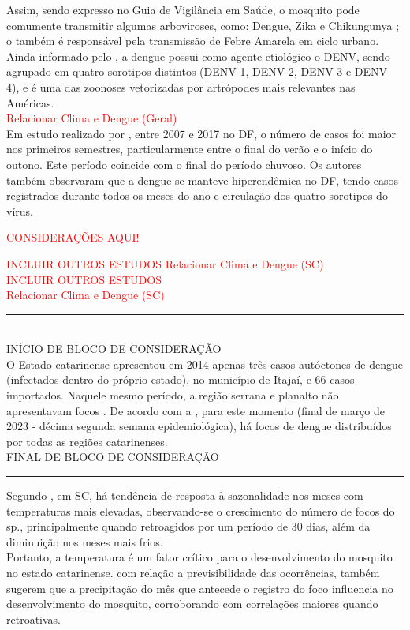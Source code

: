 \indent Assim, sendo expresso no Guia de Vigilância em Saúde, o mosquito  pode comumente transmitir algumas arboviroses, como: Dengue, Zika e Chikungunya \cite{GuiaVigSaúde22}; o  também é responsável pela transmissão de Febre Amarela em ciclo urbano. Ainda informado pelo , a dengue possui como agente etiológico o \acrfull{DENV}, sendo agrupado em quatro sorotipos distintos (\acrshort{DENV}-1, \acrshort{DENV}-2, \acrshort{DENV}-3 e \acrshort{DENV}-4), e é uma das zoonoses vetorizadas por artrópodes mais relevantes nas Américas.\\
\textcolor{red}{Relacionar Clima e Dengue (Geral)}\\
\indent Em estudo realizado por , entre 2007 e 2017 no \acrfull{DF}, o número de casos foi maior nos primeiros semestres, particularmente entre o final do verão e o início do outono. Este período  coincide com o final do período chuvoso. Os autores também observaram que a dengue se manteve hiperendêmica no \acrlong{DF}, tendo casos registrados durante todos os meses do ano e circulação dos quatro sorotipos do vírus.\\
\begin{center}
\textcolor{red}{CONSIDERAÇÕES AQUI!}\\ 
\end{center}
\textcolor{red}{INCLUIR OUTROS ESTUDOS}
\textcolor{red}{Relacionar Clima e Dengue (SC)}\\
\textcolor{red}{INCLUIR OUTROS ESTUDOS}\\
\textcolor{red}{Relacionar Clima e Dengue (SC)}\\
{\color{red} \rule{\linewidth}{0.5mm}}\color{red} \\ INÍCIO DE BLOCO DE CONSIDERAÇÃO\\
\indent O Estado catarinense apresentou em 2014 apenas três casos autóctones de dengue (infectados dentro do próprio estado), no município de Itajaí, e 66 casos importados. Naquele mesmo período, a região serrana e planalto não apresentavam focos \cite{Matiola2020Dissertação}. De acordo com a , para este momento (final de março de 2023 - décima segunda semana epidemiológica), há focos de dengue distribuídos por todas as regiões catarinenses.\\
FINAL DE BLOCO DE CONSIDERAÇÃO \\ {\color{red} \rule{\linewidth}{0.5mm}}\color{black}
\indent Segundo , em \acrlong{SC}, há tendência de resposta à sazonalidade nos meses com temperaturas mais elevadas, observando-se o crescimento do número de focos do  sp.,  principalmente quando retroagidos por um período de 30 dias, além da diminuição nos meses mais frios.\\ 
\indent Portanto, a temperatura é um fator crítico para o desenvolvimento do mosquito no estado catarinense. com relação a previsibilidade das ocorrências,  também sugerem que a precipitação do mês que antecede o registro do foco influencia no desenvolvimento do mosquito, corroborando com correlações maiores quando retroativas.\\

